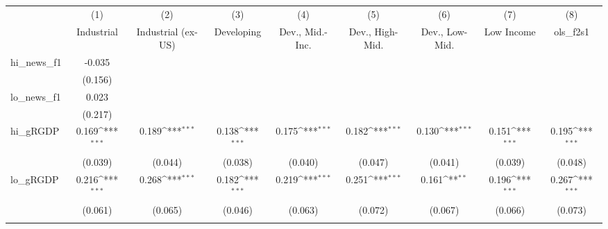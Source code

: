 {
\def\sym#1{\ifmmode^{#1}\else\(^{#1}\)\fi}
\begin{tabular}{l*{8}{c}}
\toprule
            &\multicolumn{1}{c}{(1)}&\multicolumn{1}{c}{(2)}&\multicolumn{1}{c}{(3)}&\multicolumn{1}{c}{(4)}&\multicolumn{1}{c}{(5)}&\multicolumn{1}{c}{(6)}&\multicolumn{1}{c}{(7)}&\multicolumn{1}{c}{(8)}\\
            &\multicolumn{1}{c}{Industrial}&\multicolumn{1}{c}{Industrial (ex-US)}&\multicolumn{1}{c}{Developing}&\multicolumn{1}{c}{Dev., Mid.-Inc.}&\multicolumn{1}{c}{Dev., High-Mid.}&\multicolumn{1}{c}{Dev., Low-Mid.}&\multicolumn{1}{c}{Low Income}&\multicolumn{1}{c}{ols\_f2s1}\\
\midrule
hi\_news\_f1  &      -0.035         &                     &                     &                     &                     &                     &                     &                     \\
            &     (0.156)         &                     &                     &                     &                     &                     &                     &                     \\
\addlinespace
lo\_news\_f1  &       0.023         &                     &                     &                     &                     &                     &                     &                     \\
            &     (0.217)         &                     &                     &                     &                     &                     &                     &                     \\
\addlinespace
hi\_gRGDP    &       0.169\sym{***}&       0.189\sym{***}&       0.138\sym{***}&       0.175\sym{***}&       0.182\sym{***}&       0.130\sym{***}&       0.151\sym{***}&       0.195\sym{***}\\
            &     (0.039)         &     (0.044)         &     (0.038)         &     (0.040)         &     (0.047)         &     (0.041)         &     (0.039)         &     (0.048)         \\
\addlinespace
lo\_gRGDP    &       0.216\sym{***}&       0.268\sym{***}&       0.182\sym{***}&       0.219\sym{***}&       0.251\sym{***}&       0.161\sym{**} &       0.196\sym{***}&       0.267\sym{***}\\
            &     (0.061)         &     (0.065)         &     (0.046)         &     (0.063)         &     (0.072)         &     (0.067)         &     (0.066)         &     (0.073)         \\
\addlinespace

\end{tabular}}
